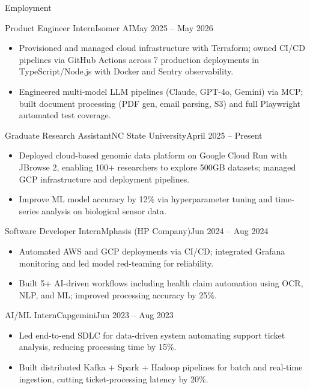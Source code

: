 \documentclass[]{mcdowellcv}
\begin{document}
\makeheader

\begin{cvsection}{Employment}
  \begin{cvsubsection}{Product Engineer Intern}{Isomer AI}{May 2025 -- May 2026}
    \begin{itemize}
      \item Provisioned and managed cloud infrastructure with Terraform; owned CI/CD pipelines via GitHub Actions across 7 production deployments in TypeScript/Node.js with Docker and Sentry observability.
      \item Engineered multi-model LLM pipelines (Claude, GPT-4o, Gemini) via MCP; built document processing (PDF gen, email parsing, S3) and full Playwright automated test coverage.
    \end{itemize}
    \vspace{-1.5pt}
  \end{cvsubsection}

  \begin{cvsubsection}{Graduate Research Assistant}{NC State University}{April 2025 -- Present}
    \begin{itemize}
      \item Deployed cloud-based genomic data platform on Google Cloud Run with JBrowse 2, enabling 100+ researchers to explore 500GB datasets; managed GCP infrastructure and deployment pipelines.
      \item Improve ML model accuracy by 12\% via hyperparameter tuning and time-series analysis on biological sensor data.
    \end{itemize}
    \vspace{-1.5pt}
  \end{cvsubsection}

  \begin{cvsubsection}{Software Developer Intern}{Mphasis (HP Company)}{Jun 2024 -- Aug 2024}
    \begin{itemize}
      \item Automated AWS and GCP deployments via CI/CD; integrated Grafana monitoring and led model red-teaming for reliability.
      \item Built 5+ AI-driven workflows including health claim automation using OCR, NLP, and ML; improved processing accuracy by 25\%.
    \end{itemize}
    \vspace{-1.5pt}
  \end{cvsubsection}

  \begin{cvsubsection}{AI/ML Intern}{Capgemini}{Jun 2023 -- Aug 2023}
    \begin{itemize}
      \item Led end-to-end SDLC for data-driven system automating support ticket analysis, reducing processing time by 15\%.
      \item Built distributed Kafka + Spark + Hadoop pipelines for batch and real-time ingestion, cutting ticket-processing latency by 20\%.
    \end{itemize}
    \vspace{-1.5pt}
  \end{cvsubsection}
\end{cvsection}
\end{document}
